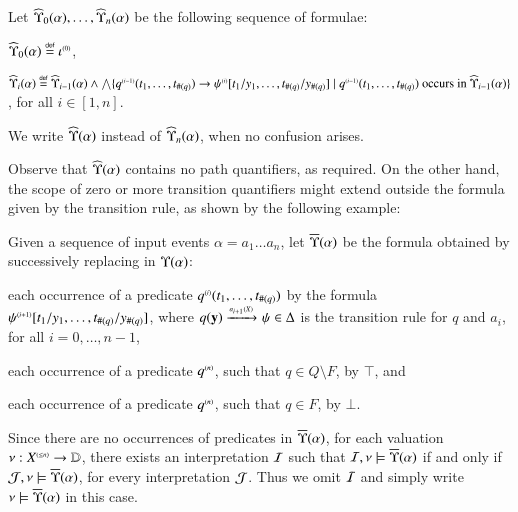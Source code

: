 \documentclass{llncs}
\begin{document}
\begin{definition}\label{def:quantform}
  Let $\widehat{\Upsilon}_{0}({\alpha}), \ldots, \widehat{\Upsilon}_{n}({\alpha})$ be the
  following sequence of formulae: \begin{compactitem}
  \item $\widehat{\Upsilon}_{0}({\alpha}) \stackrel{\scriptscriptstyle{\mathsf{def}}}{=} {\iota}^{\scriptscriptstyle{({0})}}$, 
  \item $\widehat{\Upsilon}_{i}({\alpha}) \stackrel{\scriptscriptstyle{\mathsf{def}}}{=} \widehat{\Upsilon}_{i-1}({\alpha}) \wedge
    \bigwedge \{ {q}^{\scriptscriptstyle{({i-1})}}(t_1,\ldots,t_{\#(q)}) \rightarrow
      {\psi}^{\scriptscriptstyle{({i})}}[t_1/y_1, \ldots, t_{\#(q)}/y_{\#(q)}] \mid
      {q}^{\scriptscriptstyle{({i-1})}}(t_1,\ldots,t_{\#(q)}) \text{ occurs in }
      \widehat{\Upsilon}_{i-1}({\alpha}) \}$, for all $i \in [1,n]$.    
  \end{compactitem}
  We write $\widehat{\Upsilon}({\alpha})$ instead of $\widehat{\Upsilon}_{n}({\alpha})$,
  when no confusion arises.
\end{definition}
Observe that $\widehat{\Upsilon}({\alpha})$ contains no path quantifiers, as
required. On the other hand, the scope of zero or more transition
quantifiers might extend outside the formula given by the transition
rule, as shown by the following example: 

\begin{example}\label{ex:path-quant-elim}
  
\end{example}

\begin{definition}\label{def:substform}
Given a sequence of input events $\alpha = a_1 \ldots a_n$, let
$\overline{\Upsilon}({\alpha})$ be the formula obtained by successively replacing
in $\Upsilon({\alpha})$: \begin{compactenum}[(a)]
\item\label{it1:substform} each occurrence of a predicate
  ${q}^{\scriptscriptstyle{({i})}}(t_1,\ldots,t_{\#(q)})$ by the formula
  ${\psi}^{\scriptscriptstyle{({i+1})}}[t_1/y_1,\ldots,t_{\#(q)}/y_{\#(q)}]$, where
  $q(\mathbf y) \xrightarrow{{\scriptscriptstyle a_{i+1}(X)}}_{{\scriptstyle }} \psi \in \Delta$ is the transition
  rule for $q$ and $a_i$, for all $i=0,\ldots,n-1$,
%
\item\label{it2:substform} each occurrence of a predicate
  ${q}^{\scriptscriptstyle{({n})}}$, such that $q \in Q \setminus F$, by $\top$, and
%
\item\label{it3:substform} each occurrence of a predicate
  ${q}^{\scriptscriptstyle{({n})}}$, such that $q \in F$, by $\bot$.
\end{compactenum}
\end{definition}
Since there are no occurrences of predicates in $\overline{\Upsilon}({\alpha})$,
for each valuation $\nu : {X}^{\scriptscriptstyle{({\leq n})}} \rightarrow \mathbb{D}$, there
exists an interpretation $\mathcal{I}$ such that $\mathcal{I},\nu \models
\overline{\Upsilon}({\alpha})$ if and only if $\mathcal{J},\nu \models
\overline{\Upsilon}({\alpha})$, for every interpretation $\mathcal{J}$. Thus we omit $\mathcal{I}$
and simply write $\nu \models \overline{\Upsilon}({\alpha})$ in this case.
\end{document}
